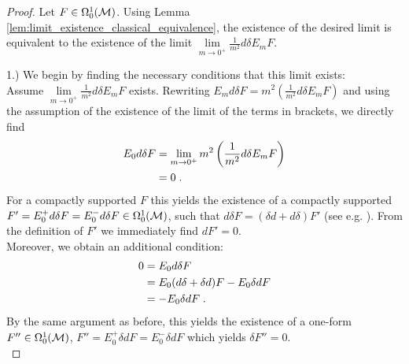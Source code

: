 \begin{proof}
	Let $F \in \Omega^1_0(\mathcal{M})$. Using Lemma \ref{lem:limit_existence_classical_equivalence}, the existence of the desired limit is equivalent to the existence of the limit $\lim\limits_{m \to 0^+} \frac{1}{m^2}d \delta E_m F $.\par
	1.) We begin by finding the necessary conditions that this limit exists:\\
	 Assume $\lim\limits_{m \to 0^+} \frac{1}{m^2}d \delta E_m F $ exists. Rewriting $E_m d \delta F = m^2 \left( \frac{1}{m^2} d \delta E_m F\right)$ and using the assumption of the existence of the limit of the terms in brackets, we directly find
	\begin{align}
		E_0 d \delta F
		&= \lim\limits_{m \to 0^+} m^2 \left( \frac{1}{m^2}d \delta E_m F \right) \notag\\
		&= 0 \;.
	\end{align}
	For a compactly supported $F$ this yields the existence of a compactly supported $F' = E^+_0 d \delta F = E^-_0 d \delta F \in \Omega^1_0(\mathcal{M})$, such that $d \delta F = (\delta d + d \delta)F'$ (see e.g. \cite[Proposition 2.6]{Sanders}). From the definition of $F'$ we immediately find $dF' = 0$.\\
	Moreover, we obtain an additional condition:
	\begin{align}
		0
		&= E_0 d \delta F\notag  \\
		&= E_0 (d \delta + \delta d)F - E_0 \delta d F \notag \\
		&= - E_0 \delta d F \;.
	\end{align}
	By the same argument as before, this yields the existence of a one-form $F'' \in \Omega^1_0(\mathcal{M})$, $F'' = E^+_0 \delta d F = E^-_0 \delta dF$ which yields $\delta F'' = 0$. \\

\end{proof}
